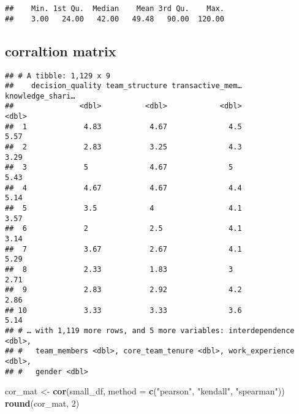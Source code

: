 \documentclass[]{article}
\newenvironment{Shaded}{\begin{snugshade}}{\end{snugshade}}
\newcommand{\DataTypeTok}[1]{\textcolor[rgb]{0.13,0.29,0.53}{#1}}
\newcommand{\DecValTok}[1]{\textcolor[rgb]{0.00,0.00,0.81}{#1}}
\newcommand{\KeywordTok}[1]{\textcolor[rgb]{0.13,0.29,0.53}{\textbf{#1}}}
\newcommand{\NormalTok}[1]{#1}
\newcommand{\OperatorTok}[1]{\textcolor[rgb]{0.81,0.36,0.00}{\textbf{#1}}}
\newcommand{\StringTok}[1]{\textcolor[rgb]{0.31,0.60,0.02}{#1}}
\begin{document}
\begin{verbatim}
##    Min. 1st Qu.  Median    Mean 3rd Qu.    Max. 
##    3.00   24.00   42.00   49.48   90.00  120.00
\end{verbatim}

\hypertarget{corraltion-matrix}{%
\subsection{corraltion matrix}\label{corraltion-matrix}}

\begin{Shaded}
\end{Shaded}

\begin{verbatim}
## # A tibble: 1,129 x 9
##    decision_quality team_structure transactive_mem… knowledge_shari…
##               <dbl>          <dbl>            <dbl>            <dbl>
##  1             4.83           4.67              4.5             5.57
##  2             2.83           3.25              4.3             3.29
##  3             5              4.67              5               5.43
##  4             4.67           4.67              4.4             5.14
##  5             3.5            4                 4.1             3.57
##  6             2              2.5               4.1             3.14
##  7             3.67           2.67              4.1             5.29
##  8             2.33           1.83              3               2.71
##  9             2.83           2.92              4.2             2.86
## 10             3.33           3.33              3.6             5.14
## # … with 1,119 more rows, and 5 more variables: interdependence <dbl>,
## #   team_members <dbl>, core_team_tenure <dbl>, work_experience <dbl>,
## #   gender <dbl>
\end{verbatim}

\begin{Shaded}
\begin{Highlighting}[]
\NormalTok{cor_mat <-}\StringTok{ }\KeywordTok{cor}\NormalTok{(small_df, }\DataTypeTok{method =} \KeywordTok{c}\NormalTok{(}\StringTok{"pearson"}\NormalTok{, }\StringTok{"kendall"}\NormalTok{, }\StringTok{"spearman"}\NormalTok{))}
\KeywordTok{round}\NormalTok{(cor_mat, }\DecValTok{2}\NormalTok{)}
\end{Highlighting}
\end{Shaded}
\end{document}
